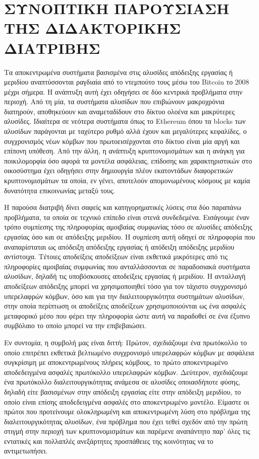 \ifuniversity
\chapter*{ΣΥΝΟΠΤΙΚΗ ΠΑΡΟΥΣΙΑΣΗ ΤΗΣ ΔΙΔΑΚΤΟΡΙΚΗΣ ΔΙΑΤΡΙΒΗΣ}
\thispagestyle{empty}

Τα αποκεντρωμένα συστήματα βασισμένα στις αλυσίδες απόδειξης εργασίας ή μεριδίου
αναπτύσσονται ραγδιαία από το ντεμπούτο τους μέσω του Bitcoin το 2008 μέχρι σήμερα.
Η ανάπτυξη αυτή έχει οδηγήσει σε δύο κεντρικά προβλήματα στην περιοχή. Από τη μία,
τα συστήματα αλυσίδων που επιβιώνουν μακροχρόνια διατηρούν, αποθηκεύουν και αναμεταδίδουν
στο δίκτυο ολοένα και μακρύτερες αλυσίδες. Ιδιαίτερα σε νεότερα συστήματα όπως το Ethereum
όπου τα blocks των αλυσίδων παράγονται με ταχύτερο ρυθμό αλλά έχουν και μεγαλύτερες κεφαλίδες,
ο συγχρονισμός νέων κόμβων που πρωτοεισέρχονται στο δίκτυο είναι μία αργή και επίπονη υπόθεση.
Από την άλλη, η ανάπτυξη κρυπτονομισμάτων και η ανάγκη για ποικιλομορφία όσο αφορά τα
μοντέλα ασφάλειας, επίδοσης και χαρακτηριστικών στο οικοσύστημα έχει οδηγήσει στην δημιουργία
πλέον εκατοντάδων διαφορετικών κρυπτονομισμάτων τα οποία, εν γένει, αποτελούν απομονωμένους
κόσμους με καμία δυνατότητα επικοινωνίας μεταξύ τους.

Η παρούσα διατριβή δίνει σαφείς και κατηγορηματικές λύσεις στα δύο
παραπάνω προβλήματα, τα οποία σε τεχνικό επίπεδο είναι στενά συνδεδεμένα. Εισάγουμε έναν
τρόπο συμπίεσης της πληροφορίας αμοιβαίας συμφωνίας τόσο σε αλυσίδες απόδειξης εργασίας
όσο και σε απόδειξης μεριδίου. Η συμπίεση αυτή οδηγεί σε πληροφορία που αναπαρίσταται ως
απόδειξη απόδειξης εργασίας ή απόδειξη απόδειξης μεριδίου αντίστοιχα. Τέτοιες αποδείξεις αποδείξεων
είναι εκθετικά μικρότερες από τις πληροφορίες αμοιβαίας συμφωνίας που ανταλλάσσονται σε
παραδοσιακά συστήματα αλυσίδων, δηλαδή τις υποβόσκουσες αποδείξεις εργασίας ή μεριδίου.
Η ανταλλαγή αποδείξεων απόδειξης μπορεί να χρησιμοποιηθεί τόσο για τον τάχιστο
συγχρονισμό υπερελαφρών κόμβων, όσο και για την διαλειτουργικότητα συστημάτων αλυσίδων, στην
οποία περίπτωση οι αποδείξεις αποδείξεων χρησιμοποιούνται ως ένα ασφαλές μεταφορικό μέσο
που φέρει την πληροφορία ώστε αυτή να παραδοθεί σε ένα έξυπνο συμβόλαιο το οποίο μπορεί να
την επιβεβαιώσει.

Εν συντομία, η συμβολή μας είναι διττή: Πρώτον, σχεδιάζουμε ένα πρωτόκολλο το οποίο επιτρέπει
εκθετικά βελτιωμένο συγχρονισμό υπερελαφρών κόμβων με ασφάλεια συγκρίσιμη με αποκεντρωμένους
πλήρεις κόμβους, το πρώτο αποκεντρωμένο αποδεδειγμένα ασφαλές πρωτόκολλο υπερελαφρών κόμβων.
Δεύτερον, σχεδιάζουμε ένα πρωτόκολλο διαλειτουργικότητας ανάμεσα σε αλυσίδες οποιασδήποτε φύσης,
δηλαδή είτε βασισμένων στην απόδειξη εργασίας είτε στην απόδειξη μεριδίου, το οποίο είναι επίσης
αποδεδειγμένα ασφαλές στο αποκεντρωμένο μοντέλο. Είμαστε οι πρώτοι που προτείνουμε ολοκληρωμένη
και αποκεντρωμένη λύση στο πρόβλημα της διαλειτουργικότητας αλυσίδων, ένα πρόβλημα που έχει
τεθεί σχεδόν από την πρώτη στιγμή στην περιοχή των κρυπτονομισμάτων και παρέμενε αναπάντητο
παρ' όλες τις εντατικές και πολλαπλές ανεξάρτητες προσπάθειες της κοινότητας να το αντιμετωπήσει.

